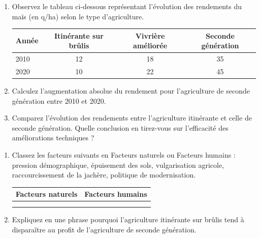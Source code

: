 \documentclass[11pt]{article}
\begin{document}
\begin{exercice}
\begin{enumerate}
    \item Observez le tableau ci-dessous représentant l'évolution des rendements du maïs (en q/ha) selon le type d'agriculture.
    \begin{center}
    \begin{tabular}{|l|c|c|c|}
    \hline
    \textbf{Année} & \textbf{Itinérante sur brûlis} & \textbf{Vivrière améliorée} & \textbf{Seconde génération} \\ \hline
    2010 & 12 & 18 & 35 \\ \hline
    2020 & 10 & 22 & 45 \\ \hline
    \end{tabular}
    \end{center}
    \item Calculez l'augmentation absolue du rendement pour l'agriculture de seconde génération entre 2010 et 2020.
    \item Comparez l'évolution des rendements entre l'agriculture itinérante et celle de seconde génération. Quelle conclusion en tirez-vous sur l'efficacité des améliorations techniques ?
\end{enumerate}
\end{exercice}

\begin{exercice}
\begin{enumerate}
    \item Classez les facteurs suivants en \og Facteurs naturels \fg{} ou \og Facteurs humains \fg{} : pression démographique, épuisement des sols, vulgarisation agricole, raccourcissement de la jachère, politique de modernisation.
    \begin{center}
    \begin{tabular}{|p{6cm}|p{6cm}|}
    \hline
    \textbf{Facteurs naturels} & \textbf{Facteurs humains} \\ \hline
     & \\ \hline
     & \\ \hline
    \end{tabular}
    \end{center}
    \item Expliquez en une phrase pourquoi l'agriculture itinérante sur brûlis tend à disparaître au profit de l'agriculture de seconde génération.
\end{enumerate}
\end{exercice}
\end{document}
